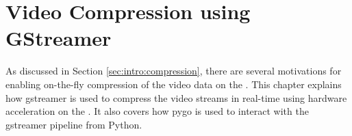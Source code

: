 \chapter{Video Compression using GStreamer}
\label{chap:gstreamer}

As discussed in Section \ref{sec:intro:compression}, there are several motivations for enabling on-the-fly compression of the video data on the \sr.
This chapter explains how \gls{gstreamer} is used to compress the video streams in real-time using hardware acceleration on the \jx.
It also covers how \gls{pygo} is used to interact with the \gls{gstreamer} pipeline from Python.
